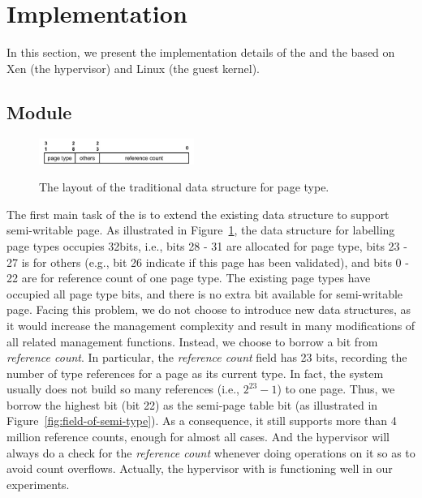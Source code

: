 \section{Implementation} \label{sec:impl}
In this section, we present the implementation details of the \module and the \cache based on Xen (the hypervisor) and Linux (the guest kernel).

\subsection{\name Module}
\begin{figure}[ht]
\centering
\includegraphics[width=0.45\textwidth]{image/implementation/field-of-page-type-info.jpg} \\
\caption{The layout of the traditional data structure for page type.}
\label{fig:field-of-page-type-info}
\end{figure}
The first main task of the \module is to extend the existing data structure to support semi-writable page.
As illustrated in Figure~\ref{fig:field-of-page-type-info}, the data structure for labelling page types occupies 32bits, i.e., bits 28 - 31 are allocated for page type, bits 23 - 27 is for others (e.g., bit 26 indicate if this page has been validated), and bits 0 - 22 are for reference count of one page type.
The existing page types have occupied all page type bits, and there is no extra bit available for semi-writable page.
Facing this problem, we do not choose to introduce new data structures, as it would increase the management complexity and result in many modifications of all related management functions.
Instead, we choose to borrow a bit from \emph{reference count}.
In particular, the \emph{reference count} field has 23 bits, recording the number of type references for a page as its current type.
In fact, the system usually does not build so many references (i.e., $2^{23}-1$) to one page. Thus, we borrow the highest bit (bit 22) as the semi-page table bit (as illustrated in Figure~\ref{fig:field-of-semi-type}).
As a consequence, it still supports more than 4 million reference counts, enough for almost all cases. And the hypervisor will always do a check for the \emph{reference count} whenever doing operations on it so as to avoid count overflows. 
Actually, the hypervisor with \name is functioning well in our experiments.

